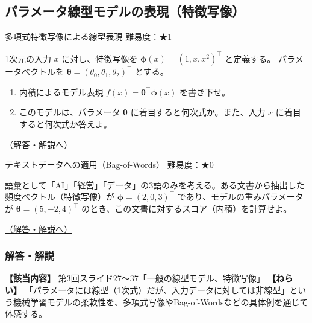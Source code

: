 \subsection{パラメータ線型モデルの表現（特徴写像）}\label{ux30d1ux30e9ux30e1ux30fcux30bfux7ddaux578bux30e2ux30c7ux30ebux306eux8868ux73feux7279ux5fb4ux5199ux50cf}

\begin{questionbox}[label=q:3-2-1]{多項式特徴写像による線型表現 \hfill \normalfont \small 難易度：★1}

1次元の入力 \(x\) に対し、特徴写像を
\(\boldsymbol{\phi}(x) = (1, x, x^2)^\top\) と定義する。
パラメータベクトルを
\(\boldsymbol{\theta} = (\theta_0, \theta_1, \theta_2)^\top\) とする。

\begin{enumerate}
\def\labelenumi{\arabic{enumi}.}
\tightlist
\item
  内積によるモデル表現
  \(f(x) = \boldsymbol{\theta}^\top \boldsymbol{\phi}(x)\) を書き下せ。
\item
  このモデルは、パラメータ \(\boldsymbol{\theta}\)
  に着目すると何次式か。また、入力 \(x\) に着目すると何次式か答えよ。
\end{enumerate}

\hfill 

\hyperref[a:3-2-1]{（解答・解説へ）}

\end{questionbox}

\begin{questionbox}[label=q:3-2-2]{テキストデータへの適用（Bag-of-Words） \hfill \normalfont \small 難易度：★0}

語彙として「AI」「経営」「データ」の3語のみを考える。ある文書から抽出した頻度ベクトル（特徴写像）が
\(\boldsymbol{\phi} = (2, 0, 3)^\top\) であり、モデルの重みパラメータが
\(\boldsymbol{\theta} = (5, -2, 4)^\top\)
のとき、この文書に対するスコア（内積）を計算せよ。

\hfill 

\hyperref[a:3-2-2]{（解答・解説へ）}

\end{questionbox}

\subsubsection{解答・解説}\label{ux89e3ux7b54ux89e3ux8aac-6}

\textbf{【該当内容】} 第3回スライド27〜37「一般の線型モデル、特徴写像」
\textbf{【ねらい】}
「パラメータには線型（1次式）だが、入力データに対しては非線型」という機械学習モデルの柔軟性を、多項式写像やBag-of-Wordsなどの具体例を通じて体感する。

